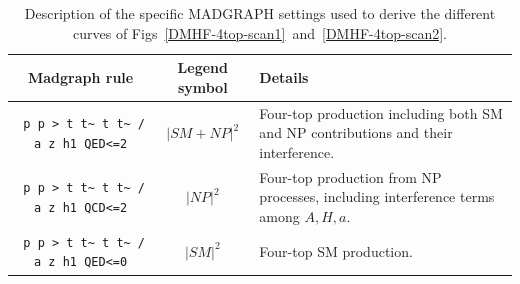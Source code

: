 \begin{table}
\begin{tabular}{ccm{50mm}}
\toprule
{\sc Madgraph} rule & Legend symbol & Details \\\midrule
\verb| p p > t t~ t t~ / a z h1 QED<=2|& $|SM+NP|^2$ & Four-top
production including both SM and NP contributions and their
interference. \\\midrule
\verb| p p > t t~ t t~ / a z h1 QCD<=2|& $|NP|^2$ & Four-top
production from NP processes, including interference terms among
$A,H,a$. \\\midrule
\verb| p p > t t~ t t~ / a z h1 QED<=0|& $|SM|^2$ & Four-top SM
production.\\
\bottomrule
\end{tabular}
\caption{Description of the specific MADGRAPH settings used to derive
the different curves of Figs~\ref{DMHF-4top-scan1}~and~\ref{DMHF-4top-scan2}.}
\label{tab-dmhf-4tops}
\end{table}

